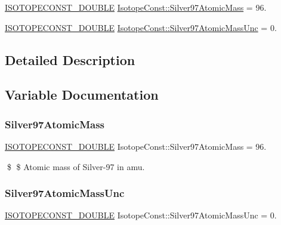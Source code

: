 \begin{DoxyCompactItemize}
\item 
\mbox{\hyperlink{group___isotope_const-_macros_ga8f45a7272ce02c0b4c65c44636ed719a}{I\+S\+O\+T\+O\+P\+E\+C\+O\+N\+S\+T\+\_\+\+D\+O\+U\+B\+LE}} \mbox{\hyperlink{group___isotope_const-_silver-_ag97_gadf780e09e8c2125c2b931da28f148bdd}{Isotope\+Const\+::\+Silver97\+Atomic\+Mass}} = 96.
\item 
\mbox{\hyperlink{group___isotope_const-_macros_ga8f45a7272ce02c0b4c65c44636ed719a}{I\+S\+O\+T\+O\+P\+E\+C\+O\+N\+S\+T\+\_\+\+D\+O\+U\+B\+LE}} \mbox{\hyperlink{group___isotope_const-_silver-_ag97_gaf396afd8171e79be348bc83e77f662ed}{Isotope\+Const\+::\+Silver97\+Atomic\+Mass\+Unc}} = 0.
\end{DoxyCompactItemize}


\subsection{Detailed Description}


\subsection{Variable Documentation}
\mbox{\label{group___isotope_const-_silver-_ag97_gadf780e09e8c2125c2b931da28f148bdd}} 
\subsubsection{\texorpdfstring{Silver97\+Atomic\+Mass}{Silver97AtomicMass}}
{\footnotesize\ttfamily \mbox{\hyperlink{group___isotope_const-_macros_ga8f45a7272ce02c0b4c65c44636ed719a}{I\+S\+O\+T\+O\+P\+E\+C\+O\+N\+S\+T\+\_\+\+D\+O\+U\+B\+LE}} Isotope\+Const\+::\+Silver97\+Atomic\+Mass = 96.}

\$ \$ Atomic mass of Silver-\/97 in amu. \mbox{\label{group___isotope_const-_silver-_ag97_gaf396afd8171e79be348bc83e77f662ed}} 
\subsubsection{\texorpdfstring{Silver97\+Atomic\+Mass\+Unc}{Silver97AtomicMassUnc}}
{\footnotesize\ttfamily \mbox{\hyperlink{group___isotope_const-_macros_ga8f45a7272ce02c0b4c65c44636ed719a}{I\+S\+O\+T\+O\+P\+E\+C\+O\+N\+S\+T\+\_\+\+D\+O\+U\+B\+LE}} Isotope\+Const\+::\+Silver97\+Atomic\+Mass\+Unc = 0.}

